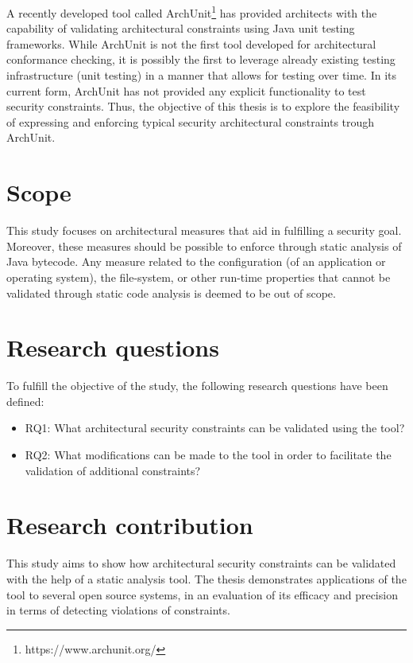 A recently developed tool called ArchUnit\footnote{https://www.archunit.org/} has provided architects with the capability of validating architectural constraints using Java unit testing frameworks. While ArchUnit is not the first tool developed for architectural conformance checking, it is possibly the first to leverage already existing testing infrastructure (unit testing) in a manner that allows for testing over time. In its current form, ArchUnit has not provided any explicit functionality to test security constraints. Thus, the objective of this thesis is to explore the feasibility of expressing and enforcing typical security architectural constraints trough ArchUnit.

\section{Scope}

This study focuses on architectural measures that aid in fulfilling a security goal. Moreover, these measures should be possible to enforce through static analysis of Java bytecode. Any measure related to the configuration (of an application or operating system), the file-system, or other run-time properties that cannot be validated through static code analysis is deemed to be out of scope.

\section{Research questions}
To fulfill the objective of the study, the following research questions have been defined:

\begin{itemize}
    \item RQ1: What architectural security constraints can be validated using the tool?
    \item RQ2: What modifications can be made to the tool in order to facilitate the validation of additional constraints?
\end{itemize}

\section{Research contribution}

This study aims to show how architectural security constraints can be validated with the help of a static analysis tool. The thesis demonstrates applications of the tool to several open source systems, in an evaluation of its efficacy and precision in terms of detecting violations of constraints.

